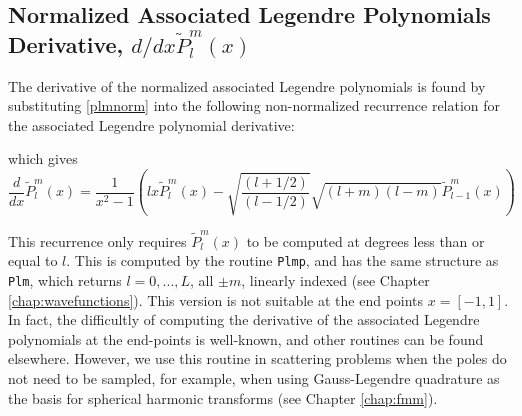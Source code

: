 %
%
%
%
%
%
%
%
%
%

\subsection{Normalized Associated Legendre Polynomials Derivative, $d/dx\widetilde{P}_l^m(x)$}


The derivative of the normalized associated Legendre polynomials is found by substituting \eqref{plmnorm} into the following non-normalized recurrence relation for the associated Legendre polynomial derivative:

which gives
\begin{equation}
\dfrac{d}{dx}\widetilde P_l^m(x) = \dfrac{1}{x^2-1}\left( lx \widetilde P_l^m(x) - \sqrt{\dfrac{(l+1/2)}{(l-1/2)}}\sqrt{(l+m)(l-m)} \widetilde P_{l-1}^m(x)\right)
\end{equation}

This recurrence only requires $\widetilde P_l^m(x)$ to be computed at degrees less than or equal to $l$.  This is computed by the routine \texttt{Plmp}, and has the same structure as \texttt{Plm}, which returns $l=0,...,L$, all $\pm m$, linearly indexed (see Chapter \ref{chap:wavefunctions}). This version is not suitable at the end points $x = [-1, 1]$. In fact, the difficultly of computing the derivative of the associated Legendre polynomials at the end-points is well-known, and other routines can be found elsewhere. However, we use this routine in scattering problems when the poles do not need to be sampled, for example, when using Gauss-Legendre quadrature as the basis for spherical harmonic transforms (see Chapter \ref{chap:fmm}). 

